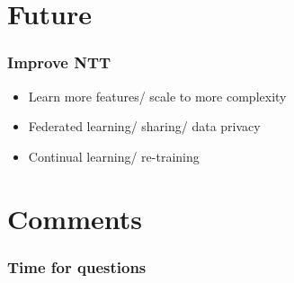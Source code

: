 \documentclass{beamer}
\begin{document}
\section{Future}

\begin{frame}
\frametitle{Improve NTT}

\begin{itemize}
    \item<1-> Learn more features/ scale to more complexity
    \item<2-> Federated learning/ sharing/ data privacy
    \item<3-> Continual learning/ re-training
\end{itemize}
\end{frame}

\section{Comments}
\begin{frame}
\frametitle{Time for questions}

\end{frame}
\end{document}
